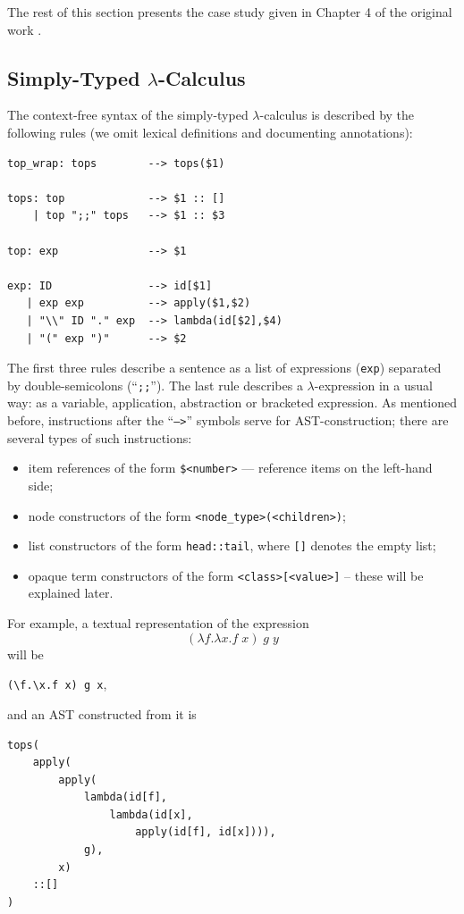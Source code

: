 \documentclass[screen]{beamer}
\newcommand{\code}[1]{\texttt{#1}}
\begin{document}
The rest of this section presents the case study given in Chapter 4 of the original work \cite{Tcg}. 

\subsection{Simply-Typed $\lambda$-Calculus}

The context-free syntax of the simply-typed $\lambda$-calculus is described by the following rules (we omit lexical definitions and documenting annotations):

\begin{verbatim}
top_wrap: tops        --> tops($1)

tops: top             --> $1 :: []
    | top ";;" tops   --> $1 :: $3

top: exp              --> $1

exp: ID               --> id[$1]
   | exp exp          --> apply($1,$2)
   | "\\" ID "." exp  --> lambda(id[$2],$4)
   | "(" exp ")"      --> $2
\end{verbatim}

The first three rules describe a sentence as a list of expressions (\code{exp}) separated by double-semicolons (``\code{;;}''). The last rule describes a $\lambda$-expression in a usual way: as a variable, application, abstraction or bracketed expression. As mentioned before, instructions after the ``\code{-->}'' symbols serve for AST-construction; there are several types of such instructions:
\begin{itemize}
 \item item references of the form \code{\$<number>} --- reference items on the left-hand side;
 \item node constructors of the form \code{<node_type>(<children>)};
 \item list constructors of the form \code{head::tail}, where \code{[]} denotes the empty list;
 \item opaque term constructors of the form \code{<class>[<value>]} -- these will be explained later.
\end{itemize}

For example, a textual representation of the expression 
$$(\lambda f.\lambda x. f\; x)\; g\; y$$
will be 
\begin{center}
\code{(\textbackslash f.\textbackslash x.f x) g x},
\end{center}
and an AST constructed from it is%
\begin{verbatim}
tops(
    apply(
        apply(
            lambda(id[f], 
                lambda(id[x], 
                    apply(id[f], id[x]))),
            g),
        x)
    ::[]
)
\end{verbatim}
\end{document}
